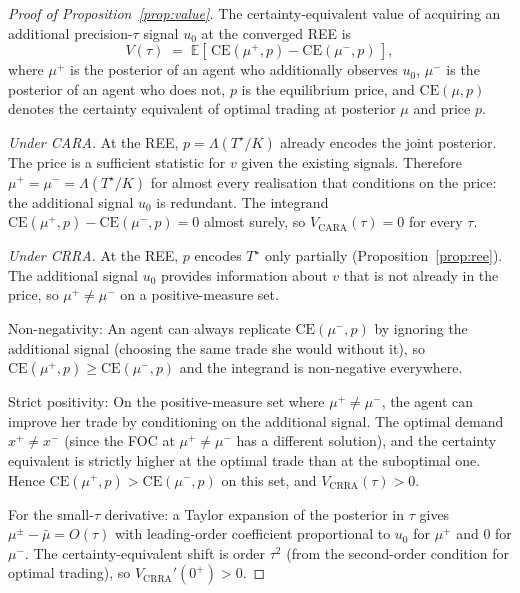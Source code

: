 \documentclass[12pt,letterpaper]{article}
\theoremstyle{definition}
\theoremstyle{remark}
\newcommand{\E}{\mathbb{E}}
\newcommand{\Lam}{\Lambda}            %
\newcommand{\Tstar}{T^{\!\star}}
\newcommand{\1}{\mathbf{1}}
\begin{document}
\begin{proof}[Proof of Proposition~\ref{prop:value}]
The certainty-equivalent value of acquiring an additional
precision-$\tau$ signal $u_{0}$ at the converged REE is
\[
   V(\tau) \;=\;
   \E\!\left[\,\mathrm{CE}\!\left(\mu^{+}\!,p\right)
            -\mathrm{CE}\!\left(\mu^{-}\!,p\right)\,\right],
\]
where $\mu^{+}$ is the posterior of an agent who additionally observes
$u_{0}$, $\mu^{-}$ is the posterior of an agent who does not, $p$ is the
equilibrium price, and $\mathrm{CE}(\mu,p)$ denotes the certainty
equivalent of optimal trading at posterior $\mu$ and price $p$.

\emph{Under CARA.} At the REE, $p=\Lam(\Tstar/K)$ already encodes the
joint posterior. The price is a sufficient statistic for $v$ given the
existing signals. Therefore $\mu^{+}=\mu^{-}=\Lam(\Tstar/K)$ for
almost every realisation that conditions on the price: the additional
signal $u_{0}$ is redundant. The integrand
$\mathrm{CE}(\mu^{+},p)-\mathrm{CE}(\mu^{-},p)=0$ almost surely, so
$V_{\mathrm{CARA}}(\tau)=0$ for every $\tau$.

\emph{Under CRRA.} At the REE, $p$ encodes $\Tstar$ only partially
(Proposition~\ref{prop:ree}). The additional signal $u_{0}$ provides
information about $v$ that is not already in the price, so
$\mu^{+}\neq\mu^{-}$ on a positive-measure set.

Non-negativity: An agent can always replicate
$\mathrm{CE}(\mu^{-},p)$ by ignoring the additional signal (choosing
the same trade she would without it), so $\mathrm{CE}(\mu^{+},p)\geq
\mathrm{CE}(\mu^{-},p)$ and the integrand is non-negative everywhere.

Strict positivity: On the positive-measure set where $\mu^{+}\neq
\mu^{-}$, the agent can improve her trade by conditioning on the
additional signal. The optimal demand $x^{+}\neq x^{-}$ (since the FOC
at $\mu^{+}\neq\mu^{-}$ has a different solution), and the certainty
equivalent is strictly higher at the optimal trade than at the
suboptimal one. Hence
$\mathrm{CE}(\mu^{+},p)>\mathrm{CE}(\mu^{-},p)$ on this set, and
$V_{\mathrm{CRRA}}(\tau)>0$.

For the small-$\tau$ derivative: a Taylor expansion of the posterior in
$\tau$ gives $\mu^{\pm}-\bar\mu=O(\tau)$ with leading-order coefficient
proportional to $u_{0}$ for $\mu^{+}$ and $0$ for $\mu^{-}$. The
certainty-equivalent shift is order $\tau^{2}$ (from the second-order
condition for optimal trading), so
$V_{\mathrm{CRRA}}'(0^{+})>0$.
\end{proof}
\end{document}
